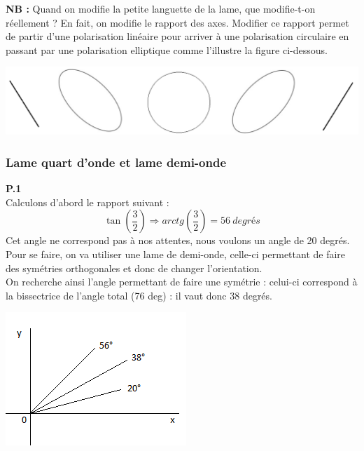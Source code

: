 \documentclass	[11pt, a4paper, openany]{book}
\begin{document}
\textbf{NB :} Quand on modifie la petite languette de la lame, que modifie-t-on réellement ? En fait, on modifie le rapport des axes. Modifier ce rapport permet de partir d'une polarisation linéaire pour arriver à une polarisation circulaire en passant par une polarisation elliptique comme l'illustre la figure ci-dessous.
\begin{center}
\includegraphics[scale=0.5]{labo/image5.png}
\end{center}

\subsubsection*{Lame quart d'onde et lame demi-onde}
\textbf{P.1}\\
Calculons d'abord le rapport suivant : 
\begin{equation}
\tan\left(\frac{3}{2}\right) \Rightarrow arctg\left(\frac{3}{2}\right) = 56\ degrés
\end{equation}
Cet angle ne correspond pas à nos attentes, nous voulons un angle de 20 degrés. Pour se faire, on va utiliser une lame de demi-onde, celle-ci permettant de faire des symétries orthogonales et donc de changer l'orientation.\\
On recherche ainsi l'angle permettant de faire une symétrie : celui-ci correspond à la bissectrice de l'angle total (76 deg) : il vaut donc 38 degrés.
\begin{center}
\includegraphics[scale=0.8]{labo/image6.png}
\end{center}
\ \\
\end{document}
